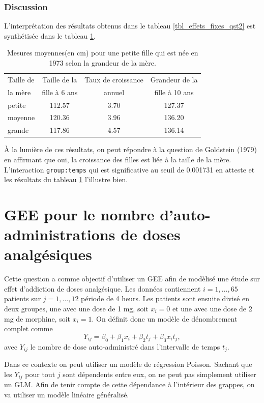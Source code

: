 \documentclass{article}
\begin{document}
	\subsubsection*{Discussion}
		L'interprétation des résultats obtenus dans le tableau \ref{tbl_effets_fixes_qst2} est synthétisée dans le tableau \ref{tbl_interpretation_qst2}.
		\begin{table}[H]
			\centering
			\begin{tabular}{lccc}
				\hline
				Taille de  & Taille de la  & Taux de croissance  &  Grandeur de la \\
				la mère & fille à 6 ans & annuel &  fille à 10 ans \\
				\hline
				petite & 112.57 & 3.70 & 127.37 \\
				moyenne & 120.36 & 3.96 & 136.20 \\
				grande & 117.86 & 4.57 & 136.14 \\
				\hline
			\end{tabular}
			\caption{Mesures moyennes(en cm) pour une petite fille qui est née en 1973 selon la grandeur de la mère.}
			\label{tbl_interpretation_qst2}
		\end{table}
				
		À la lumière de ces résultats, on peut répondre à la question de Goldstein (1979) en affirmant que oui, la croissance des filles est liée à la taille de la mère.
		L'interaction \texttt{group:temps} qui est significative au seuil de 0.001731 en atteste et les résultats du tableau \ref{tbl_interpretation_qst2} l'illustre bien.
		

\section{GEE pour le nombre d'auto-administrations de doses analgésiques}

Cette question a comme objectif d'utiliser un GEE afin de modèlisé une étude sur effet d'addiction de doses analgésique. Les données contiennent $i = 1, \dots, 65$ patients sur $j=1,\dots,12$ période de 4 heurs. Les patients sont ensuite divisé en deux groupes, une avec une dose de 1 mg, soit $x_i =0$ et une avec une dose de 2 mg de morphine, soit $x_i =1$. On définit donc un modèle de dénombrement complet comme
$$Y_{ij} = \beta_0 + \beta_1 x_i + \beta_2 t_j+ \beta_3 x_i t_j,$$
avec $Y_{ij}$ le nombre de dose auto-administré dans l'intervalle de temps $t_j$. 
	
	
	Dans ce contexte on peut utiliser un modèle de régression Poisson. Sachant que les $Y_{ij}$ pour tout $j$ sont dépendents entre eux, on ne peut pas simplement utiliser un GLM. Afin de tenir compte de cette dépendance à l'intérieur des grappes, on va utiliser un modèle linéaire généralisé. 
	
\end{document}
